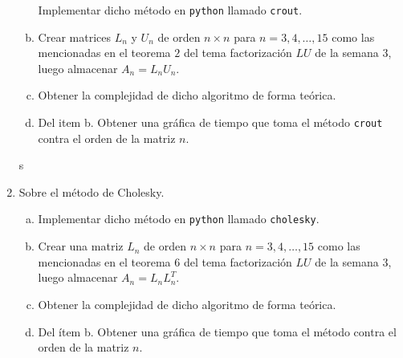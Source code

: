 \documentclass[
	spanish,
	9pt,
	utf8,
	xcolor=table,
	handout,
	aspectratio=1610,
	professionalfonts,
	notheorems,
	mathserif,
]{beamer}
\begin{document}
\begin{frame}
\begin{enumerate}
\begin{enumerate}[a)]
			            Implementar dicho método en \texttt{python} llamado \texttt{crout}.

			      \item

			            Crear matrices $L_{n}$ y $U_{n}$ de orden $n\times n$ para $n=3,4,\dotsc,15$ como las mencionadas en el teorema $2$ del tema factorización $LU$ de la semana $3$, luego almacenar $A_{n}=L_{n}U_{n}$.

			      \item

			            Obtener la complejidad de dicho algoritmo de forma teórica.

			      \item

			            Del item b.
			            Obtener una gráfica de tiempo que toma el método \texttt{crout} contra el orden de la matriz $n$.
		      \end{enumerate}s

		\item
		      Sobre el método de Cholesky.

		      \begin{enumerate}[a)]
			      \item

			            Implementar dicho método en \texttt{python} llamado \texttt{cholesky}.


			      \item

			            Crear una matriz $L_{n}$ de orden $n\times n$ para $n=3,4,\dotsc,15$ como las mencionadas en el teorema $6$ del tema factorización $LU$ de la semana $3$, luego almacenar $A_{n}=L_{n}L_{n}^{T}$.

			      \item

			            Obtener la complejidad de dicho algoritmo de forma teórica.

			      \item

			            Del ítem b.
			            Obtener una gráfica de tiempo que toma el método  contra el orden de la matriz $n$.
		      \end{enumerate}

	\end{enumerate}
\end{frame}
\end{document}
